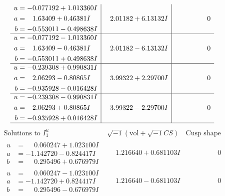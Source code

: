 \documentclass[1p]{elsarticle_modified}
\theoremstyle{definition}
\newcommand{\I}{\sqrt{-1}}
\begin{document}
$$\begin{array}{c|c|c}
\begin{aligned}
u &= -0.077192 + 1.013360 I \\
a &= \phantom{-}1.63409 + 0.46381 I \\
b &= -0.553011 - 0.498638 I\end{aligned}
 & \phantom{-}2.01182 + 6.13132 I & \phantom{-0.000000 } 0 \\ \hline\begin{aligned}
u &= -0.077192 - 1.013360 I \\
a &= \phantom{-}1.63409 - 0.46381 I \\
b &= -0.553011 + 0.498638 I\end{aligned}
 & \phantom{-}2.01182 - 6.13132 I & \phantom{-0.000000 } 0 \\ \hline\begin{aligned}
u &= -0.239308 + 0.990831 I \\
a &= \phantom{-}2.06293 - 0.80865 I \\
b &= -0.935928 - 0.016428 I\end{aligned}
 & \phantom{-}3.99322 + 2.29700 I & \phantom{-0.000000 } 0 \\ \hline\begin{aligned}
u &= -0.239308 - 0.990831 I \\
a &= \phantom{-}2.06293 + 0.80865 I \\
b &= -0.935928 + 0.016428 I\end{aligned}
 & \phantom{-}3.99322 - 2.29700 I & \phantom{-0.000000 } 0\\
 \hline 
 \end{array}$$\newpage$$\begin{array}{c|c|c}  
\text{Solutions to }I^u_{1}& \I (\text{vol} + \sqrt{-1}CS) & \text{Cusp shape}\\
 \hline 
\begin{aligned}
u &= \phantom{-}0.060247 + 1.023100 I \\
a &= -1.142720 - 0.824417 I \\
b &= \phantom{-}0.295496 + 0.676979 I\end{aligned}
 & \phantom{-}1.216640 + 0.681103 I & \phantom{-0.000000 } 0 \\ \hline\begin{aligned}
u &= \phantom{-}0.060247 - 1.023100 I \\
a &= -1.142720 + 0.824417 I \\
b &= \phantom{-}0.295496 - 0.676979 I\end{aligned}
 & \phantom{-}1.216640 - 0.681103 I & \phantom{-0.000000 } 0 \\ \hline\begin{aligned}

\end{aligned}
\end{array}$$
\end{document}
